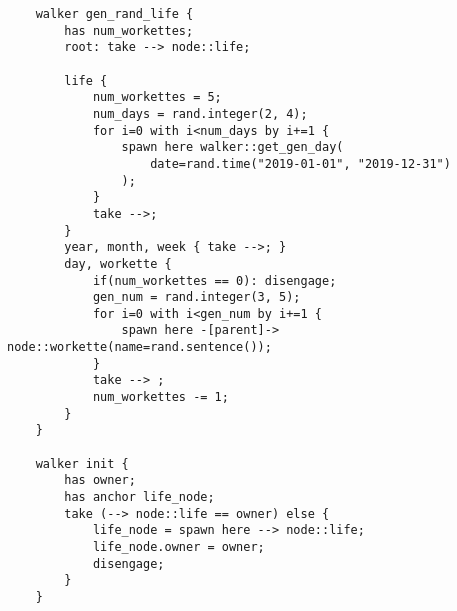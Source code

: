 \begin{lstlisting}
    walker gen_rand_life {
        has num_workettes;
        root: take --> node::life;

        life {
            num_workettes = 5;
            num_days = rand.integer(2, 4);
            for i=0 with i<num_days by i+=1 {
                spawn here walker::get_gen_day(
                    date=rand.time("2019-01-01", "2019-12-31")
                );
            }
            take -->;
        }
        year, month, week { take -->; }
        day, workette {
            if(num_workettes == 0): disengage;
            gen_num = rand.integer(3, 5);
            for i=0 with i<gen_num by i+=1 {
                spawn here -[parent]-> node::workette(name=rand.sentence());
            }
            take --> ;
            num_workettes -= 1;
        }
    }

    walker init {
        has owner;
        has anchor life_node;
        take (--> node::life == owner) else {
            life_node = spawn here --> node::life;
            life_node.owner = owner;
            disengage;
        }
    }

    \end{lstlisting}